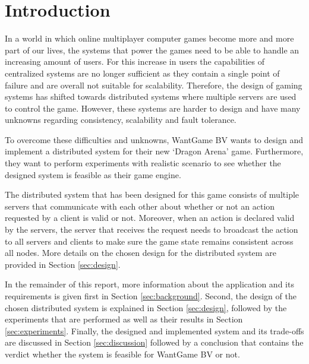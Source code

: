 \section{Introduction}
In a world in which online multiplayer computer games become more and more part of our lives, the systems that power the games need to be able to handle an increasing amount of users.
For this increase in users the capabilities of centralized systems are no longer sufficient as they contain a single point of failure and are overall not suitable for scalability.
Therefore, the design of gaming systems has shifted towards distributed systems where multiple servers are used to control the game.
However, these systems are harder to design and have many unknowns regarding consistency, scalability and fault tolerance.

To overcome these difficulties and unknowns, WantGame BV wants to design and implement a distributed system for their new `Dragon Arena' game.
Furthermore, they want to perform experiments with realistic scenario to see whether the designed system is feasible as their game engine.

The distributed system that has been designed for this game consists of multiple servers that communicate with each other about whether or not an action requested by a client is valid or not. 
Moreover, when an action is declared valid by the servers, the server that receives the request needs to broadcast the action to all servers and clients to make sure the game state remains consistent across all nodes.
More details on the chosen design for the distributed system are provided in Section \ref{sec:design}.

In the remainder of this report, more information about the application and its requirements is given first in Section \ref{sec:background}. 
Second, the design of the chosen distributed system is explained in Section \ref{sec:design}, followed by the experiments that are performed as well as their results in Section \ref{sec:experiments}.
Finally, the designed and implemented system and its trade-offs are discussed in Section \ref{sec:discussion} followed by a conclusion that contains the verdict whether the system is feasible for WantGame BV or not.